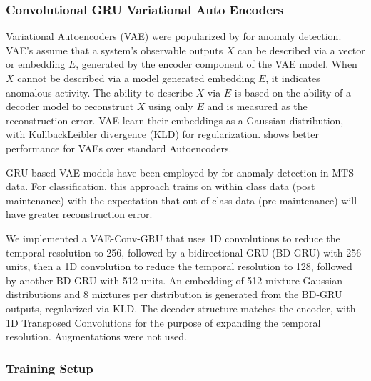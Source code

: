 \documentclass[letterpaper]{article} %
\begin{document}
\subsubsection{Convolutional GRU Variational Auto Encoders}

Variational Autoencoders (VAE) were popularized by \cite{an2015variational} for anomaly detection. VAE's assume that a system's observable outputs \(X\) can be described via a vector or embedding \(E\), generated by the encoder component of the VAE model. When \(X\) cannot be described via a model generated embedding \(E\), it indicates anomalous activity. The ability to describe \(X\) via \(E\) is based on the ability of a decoder model to reconstruct \(X\) using only \(E\) and is measured as the reconstruction error. VAE learn their embeddings as a Gaussian distribution, with KullbackLeibler divergence (KLD) for regularization. \cite{an2015variational} shows better performance for VAEs over standard Autoencoders.

GRU based VAE models have been employed by \cite{guo2018multidimensional} for anomaly detection in MTS data. For classification, this approach trains on within class data (post maintenance) with the expectation that out of class data (pre maintenance) will have greater reconstruction error. 

We implemented a VAE-Conv-GRU that uses 1D convolutions to reduce the temporal resolution to 256, followed by a bidirectional GRU (BD-GRU) with 256 units, then a 1D convolution to reduce the temporal resolution to 128, followed by another BD-GRU with 512 units. An embedding of 512 mixture Gaussian distributions and 8 mixtures per distribution is generated from the BD-GRU outputs, regularized via KLD. The decoder structure matches the encoder, with 1D Transposed Convolutions for the purpose of expanding the temporal resolution. Augmentations were not used.

\subsubsection{Training Setup}
\end{document}
